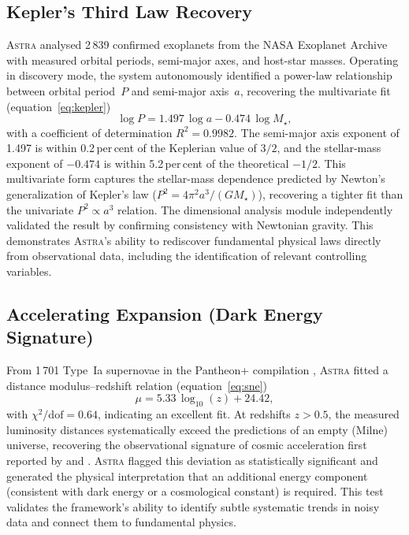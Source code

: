 \documentclass[usenatbib]{rasti}
\newcommand{\astra}{\textsc{Astra}\xspace}
\begin{document}
\subsection{Kepler's Third Law Recovery}
\label{sec:live:kepler}

\astra analysed 2\,839 confirmed exoplanets from the NASA Exoplanet Archive with measured orbital periods, semi-major axes, and host-star masses.
Operating in discovery mode, the system autonomously identified a power-law relationship between orbital period~$P$ and semi-major axis~$a$, recovering the multivariate fit (equation~\ref{eq:kepler})
\begin{equation}
  \log P = 1.497\,\log a - 0.474\,\log M_{\star},
  \label{eq:kepler}
\end{equation}
with a coefficient of determination $R^{2} = 0.9982$.
The semi-major axis exponent of 1.497 is within 0.2\,per\,cent of the Keplerian value of $3/2$, and the stellar-mass exponent of $-0.474$ is within 5.2\,per\,cent of the theoretical $-1/2$.
This multivariate form captures the stellar-mass dependence predicted by Newton's generalization of Kepler's law ($P^{2} = 4\pi^{2} a^{3}/(GM_{\star})$), recovering a tighter fit than the univariate $P^{2} \propto a^{3}$ relation.
The dimensional analysis module independently validated the result by confirming consistency with Newtonian gravity.
This demonstrates \astra's ability to rediscover fundamental physical laws directly from observational data, including the identification of relevant controlling variables.

\subsection{Accelerating Expansion (Dark Energy Signature)}
\label{sec:live:sne}

From 1\,701 Type~Ia supernovae in the Pantheon+ compilation \citep{Brout2022}, \astra fitted a distance modulus--redshift relation (equation~\ref{eq:sne})
\begin{equation}
  \mu = 5.33\,\log_{10}(z) + 24.42,
  \label{eq:sne}
\end{equation}
with $\chi^{2}/\mathrm{dof} = 0.64$, indicating an excellent fit.
At redshifts $z > 0.5$, the measured luminosity distances systematically exceed the predictions of an empty (Milne) universe, recovering the observational signature of cosmic acceleration first reported by \citet{Riess1998} and \citet{Perlmutter1999}.
\astra flagged this deviation as statistically significant and generated the physical interpretation that an additional energy component (consistent with dark energy or a cosmological constant) is required.
This test validates the framework's ability to identify subtle systematic trends in noisy data and connect them to fundamental physics.
\end{document}
